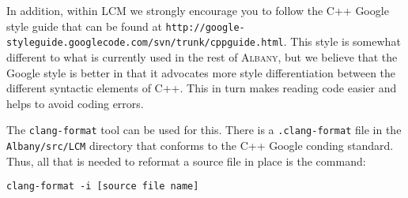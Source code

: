 \documentclass{article}
\newcommand{\albany}{\textsc{Albany}}
\newcommand{\lcm}{\textsc{LCM}}
\begin{document}
In addition, within \lcm{} we strongly encourage you to follow the C++
Google style guide that can be found at
\verb+http://google-styleguide.googlecode.com/svn/trunk/cppguide.html+.
This style is somewhat different to what is currently used in the rest
of \albany{}, but we believe that the Google style is better in that
it advocates more style differentiation between the different
syntactic elements of C++. This in turn makes reading code easier and
helps to avoid coding errors.

The \verb+clang-format+ tool can be used for this. There is a
\verb+.clang-format+ file in the \verb+Albany/src/LCM+ directory that conforms
to the C++ Google conding standard. Thus, all that is needed to reformat a
source file in place is the command:
\begin{verbatim}
clang-format -i [source file name]
\end{verbatim}
\end{document}
